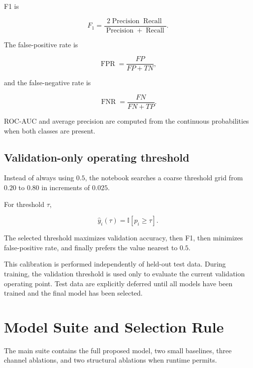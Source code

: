 \documentclass[11pt,a4paper]{article}
\begin{document}
F1 is

\begin{equation}
F_1
=
\frac{
2\operatorname{Precision}\operatorname{Recall}
}{
\operatorname{Precision}+\operatorname{Recall}
}.
\end{equation}

The false-positive rate is

\begin{equation}
\operatorname{FPR}
=
\frac{FP}{FP+TN},
\end{equation}

and the false-negative rate is

\begin{equation}
\operatorname{FNR}
=
\frac{FN}{FN+TP}.
\end{equation}

ROC-AUC and average precision are computed from the continuous probabilities when both classes are present.

\subsection{Validation-only operating threshold}

Instead of always using $0.5$, the notebook searches a coarse threshold grid from $0.20$ to $0.80$ in increments of $0.025$.

For threshold $\tau$,

\begin{equation}
\hat{y}_i(\tau)
=
\mathbb{I}[p_i\ge\tau].
\end{equation}

The selected threshold maximizes validation accuracy, then F1, then minimizes false-positive rate, and finally prefers the value nearest to $0.5$.

This calibration is performed independently of held-out test data. During training, the validation threshold is used only to evaluate the current validation operating point. Test data are explicitly deferred until all models have been trained and the final model has been selected.

\section{Model Suite and Selection Rule}

The main suite contains the full proposed model, two small baselines, three channel ablations, and two structural ablations when runtime permits.
\end{document}

